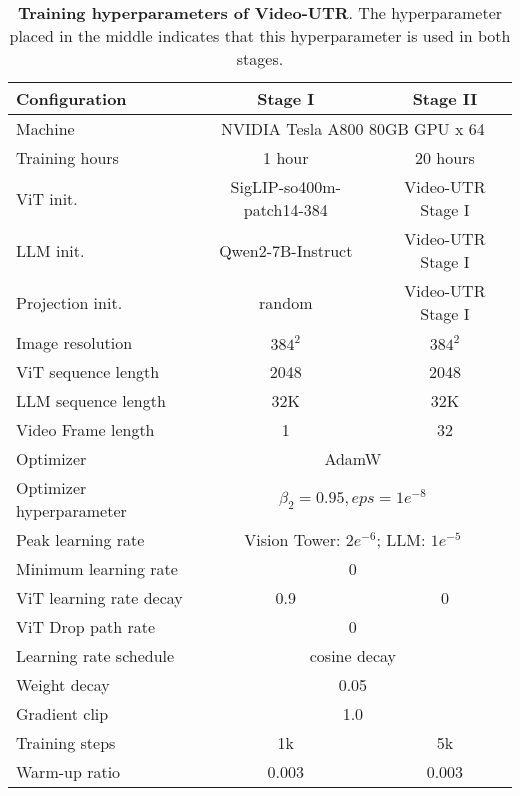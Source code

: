 \begin{table}[t]
    \centering
    \caption{\textbf{Training hyperparameters of Video-UTR}. The hyperparameter placed in the middle indicates that this hyperparameter is used in both stages.}
    \begin{tabular}{l cc}
         \toprule
         \textbf{Configuration}            & \textbf{Stage I} & \textbf{Stage II} \\
         \midrule
         Machine                  & \multicolumn{2}{c}{NVIDIA Tesla A800 80GB GPU x 64}\\
         Training hours           & 1 hour   & 20 hours\\
         \midrule
         ViT init.                & SigLIP-so400m-patch14-384 & Video-UTR Stage I\\
         LLM init.                & Qwen2-7B-Instruct & Video-UTR Stage I \\
         Projection init.         & random & Video-UTR Stage I \\
         Image resolution         & $384^2$ & $384^2$ \\
         ViT sequence length      & 2048 & 2048 \\
         LLM sequence length      & 32K & 32K\\
         Video Frame length       & 1 & 32 \\
         Optimizer                & \multicolumn{2}{c}{AdamW} \\
         Optimizer hyperparameter & \multicolumn{2}{c}{$\beta_{2}=0.95, eps=1e^{-8}$} \\
         Peak learning rate       & \multicolumn{2}{c}{Vision Tower:  $2e^{-6}$;  LLM: $1e^{-5}$} \\
         Minimum learning rate    & \multicolumn{2}{c}{0} \\
         ViT learning rate decay  & 0.9 & 0 \\
         ViT Drop path rate       & \multicolumn{2}{c}{0} \\
         Learning rate schedule   & \multicolumn{2}{c}{cosine decay} \\
         Weight decay             & \multicolumn{2}{c}{0.05} \\
         Gradient clip            & \multicolumn{2}{c}{1.0} \\
         Training steps           & 1k & 5k \\
         Warm-up ratio            & 0.003 & 0.003 \\

\end{tabular}
\end{table}

